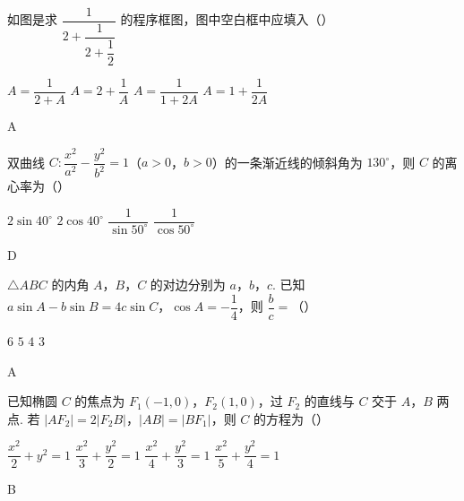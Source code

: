 \begin{problem}
如图是求 \( \dfrac{1}{2+\dfrac{1}{2+\dfrac{1}{2}}} \) 的程序框图，图中空白框中应填入（\quad）


\choices
    {\( A=\dfrac{1}{2+A} \)}
    {\( A=2+\dfrac{1}{A} \)}
    {\( A=\dfrac{1}{1+2A} \)}
    {\( A=1+\dfrac{1}{2A} \)}
\end{problem}

\begin{answer}
A
\end{answer}

\begin{problem}
双曲线 \( C:\dfrac{x^2}{a^2}-\dfrac{y^2}{b^2}=1 \)（\( a>0 \)，\( b>0 \)）的一条渐近线的倾斜角为 \( 130^\circ \)，则 \(C\) 的离心率为（\quad）

\choices
    {\( 2\sin 40^\circ \)}
    {\( 2\cos 40^\circ \)}
    {\( \dfrac{1}{\sin 50^\circ} \)}
    {\( \dfrac{1}{\cos 50^\circ} \)}
\end{problem}

\begin{answer}
D
\end{answer}

\begin{problem}
\( \triangle ABC \) 的内角 \(A\)，\(B\)，\(C\) 的对边分别为 \(a\)，\(b\)，\(c\). 已知 \( a\sin A-b\sin B=4c\sin C \)，\( \cos A=-\dfrac{1}{4} \)，则 \( \dfrac{b}{c}=\)（\quad）

\choices
    {\( 6 \)}
    {\( 5 \)}
    {\( 4 \)}
    {\( 3 \)}
\end{problem}

\begin{answer}
A
\end{answer}

\begin{problem}
已知椭圆 \(C\) 的焦点为 \( F_1(-1,0) \)，\( F_2(1,0) \)，过 \(F_2\) 的直线与 \(C\) 交于 \(A\)，\(B\) 两点. 若 \( |AF_2|=2|F_2B| \)，\( |AB|=|BF_1| \)，则 \(C\) 的方程为（\quad）

\choices
    {\( \dfrac{x^2}{2}+y^2=1 \)}
    {\( \dfrac{x^2}{3}+\dfrac{y^2}{2}=1 \)}
    {\( \dfrac{x^2}{4}+\dfrac{y^2}{3}=1 \)}
    {\( \dfrac{x^2}{5}+\dfrac{y^2}{4}=1 \)}
\end{problem}

\begin{answer}
B
\end{answer}

